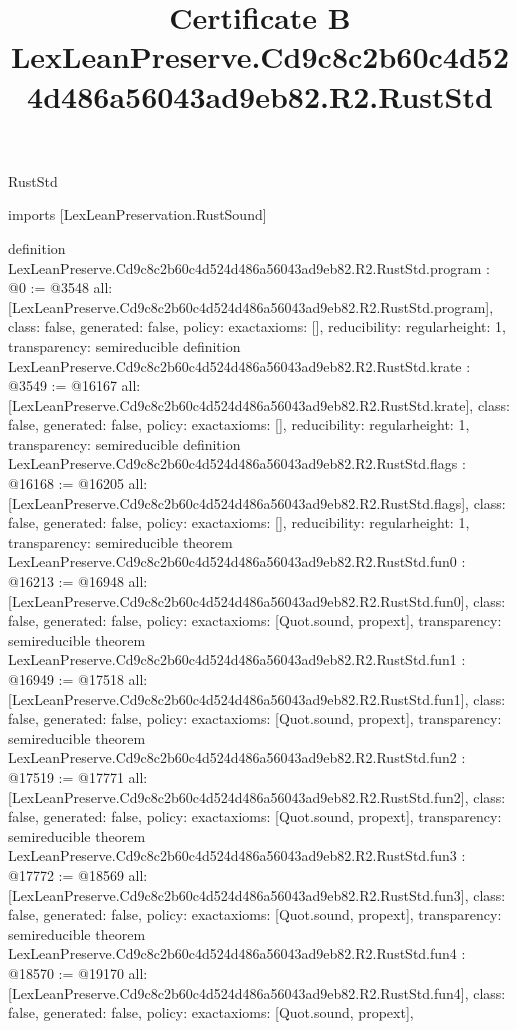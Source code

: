 \begin{lexlean}{RustStd}
\title{Certificate B LexLeanPreserve.Cd9c8c2b60c4d524d486a56043ad9eb82.R2.RustStd}
\begin{coremodule}
imports [LexLeanPreservation.RustSound]

definition LexLeanPreserve.Cd9c8c2b60c4d524d486a56043ad9eb82.R2.RustStd.program : @0 := @3548 {
  all: [LexLeanPreserve.Cd9c8c2b60c4d524d486a56043ad9eb82.R2.RustStd.program],
  class: false,
  generated: false,
  policy: exact{axioms: []},
  reducibility: regular{height: 1},
  transparency: semireducible
}
definition LexLeanPreserve.Cd9c8c2b60c4d524d486a56043ad9eb82.R2.RustStd.krate : @3549 := @16167 {
  all: [LexLeanPreserve.Cd9c8c2b60c4d524d486a56043ad9eb82.R2.RustStd.krate],
  class: false,
  generated: false,
  policy: exact{axioms: []},
  reducibility: regular{height: 1},
  transparency: semireducible
}
definition LexLeanPreserve.Cd9c8c2b60c4d524d486a56043ad9eb82.R2.RustStd.flags : @16168 := @16205 {
  all: [LexLeanPreserve.Cd9c8c2b60c4d524d486a56043ad9eb82.R2.RustStd.flags],
  class: false,
  generated: false,
  policy: exact{axioms: []},
  reducibility: regular{height: 1},
  transparency: semireducible
}
theorem LexLeanPreserve.Cd9c8c2b60c4d524d486a56043ad9eb82.R2.RustStd.fun0 : @16213 := @16948 {
  all: [LexLeanPreserve.Cd9c8c2b60c4d524d486a56043ad9eb82.R2.RustStd.fun0],
  class: false,
  generated: false,
  policy: exact{axioms: [Quot.sound, propext]},
  transparency: semireducible
}
theorem LexLeanPreserve.Cd9c8c2b60c4d524d486a56043ad9eb82.R2.RustStd.fun1 : @16949 := @17518 {
  all: [LexLeanPreserve.Cd9c8c2b60c4d524d486a56043ad9eb82.R2.RustStd.fun1],
  class: false,
  generated: false,
  policy: exact{axioms: [Quot.sound, propext]},
  transparency: semireducible
}
theorem LexLeanPreserve.Cd9c8c2b60c4d524d486a56043ad9eb82.R2.RustStd.fun2 : @17519 := @17771 {
  all: [LexLeanPreserve.Cd9c8c2b60c4d524d486a56043ad9eb82.R2.RustStd.fun2],
  class: false,
  generated: false,
  policy: exact{axioms: [Quot.sound, propext]},
  transparency: semireducible
}
theorem LexLeanPreserve.Cd9c8c2b60c4d524d486a56043ad9eb82.R2.RustStd.fun3 : @17772 := @18569 {
  all: [LexLeanPreserve.Cd9c8c2b60c4d524d486a56043ad9eb82.R2.RustStd.fun3],
  class: false,
  generated: false,
  policy: exact{axioms: [Quot.sound, propext]},
  transparency: semireducible
}
theorem LexLeanPreserve.Cd9c8c2b60c4d524d486a56043ad9eb82.R2.RustStd.fun4 : @18570 := @19170 {
  all: [LexLeanPreserve.Cd9c8c2b60c4d524d486a56043ad9eb82.R2.RustStd.fun4],
  class: false,
  generated: false,
  policy: exact{axioms: [Quot.sound, propext]},
}
\end{coremodule}
\end{lexlean}
